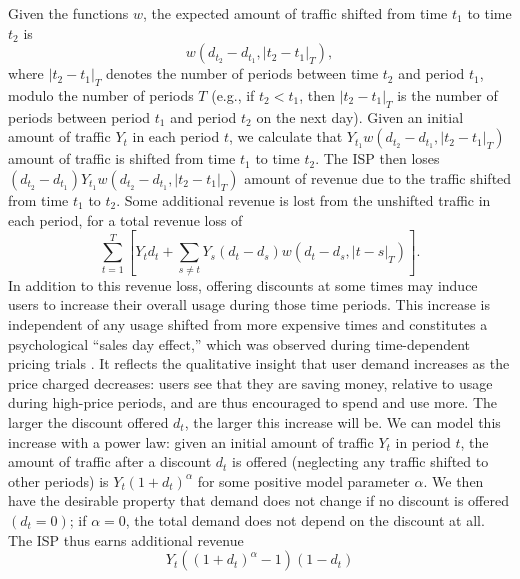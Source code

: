 Given the functions $w$, the expected amount of traffic shifted from time $t_1$ to time $t_2$ is
\begin{equation*}
w\left(d_{t_2} - d_{t_1}, \left|t_2 - t_1\right|_T\right),
\end{equation*}
where $\left|t_2 - t_1\right|_T$ denotes the number of periods between time $t_2$ and period $t_1$, modulo the number of periods $T$ (e.g., if $t_2 < t_1$, then $\left|t_2 - t_1\right|_T$ is the number of periods between period $t_1$ and period $t_2$ on the next day). Given an initial amount of traffic $Y_t$ in each period $t$, we calculate that $Y_{t_1}w\left(d_{t_2} - d_{t_1}, \left|t_2 - t_1\right|_T\right)$ amount of traffic is shifted from time $t_1$ to time $t_2$. The ISP then loses $\left(d_{t_2} - d_{t_1}\right)Y_{t_1}w\left(d_{t_2} - d_{t_1}, \left|t_2 - t_1\right|_T\right)$ amount of revenue due to the traffic shifted from time $t_1$ to $t_2$. Some additional revenue is lost from the unshifted traffic in each period, for a total revenue loss of
\begin{equation}
\sum_{t = 1}^T \left[Y_td_t + \sum_{s\neq t} Y_s\left(d_t - d_s\right)w\left(d_t - d_s, \left|t - s\right|_T\right)\right].
\label{eq:loss}
\end{equation}
In addition to this revenue loss, offering discounts at some times may induce users to increase their overall usage during those time periods. This increase is independent of any usage shifted from more expensive times and constitutes a psychological ``sales day effect,'' which was observed during time-dependent pricing trials \cite{ha2012tube,sigchi}. It reflects the qualitative insight that user demand increases as the price charged decreases: users see that they are saving money, relative to usage during high-price periods, and are thus encouraged to spend and use more. The larger the discount offered $d_t$, the larger this increase will be. We can model this increase with a power law: given an initial amount of traffic $Y_t$ in period $t$, the amount of traffic after a discount $d_t$ is offered (neglecting any traffic shifted to other periods) is $Y_t\left(1 + d_t\right)^\alpha$ for some positive model parameter $\alpha$. We then have the desirable property that demand does not change if no discount is offered $\left(d_t = 0\right)$; if $\alpha = 0$, the total demand does not depend on the discount at all. The ISP thus earns additional revenue
\begin{equation}
Y_t\left(\left(1 + d_t\right)^\alpha - 1\right)(1 - d_t)
\label{eq:revenue}
\end{equation}
